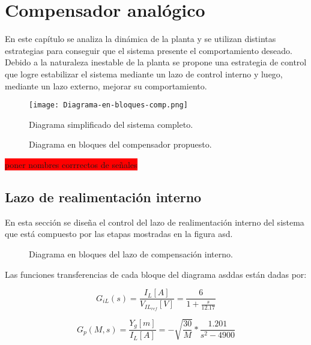 \chapter{Compensador analógico}  \label{cap:Compensador Analogico}

En este capítulo se analiza la dinámica de la planta y se utilizan distintas estrategias para conseguir que el sistema presente el comportamiento deseado. Debido a la naturaleza inestable de la planta se propone una estrategia de control que logre estabilizar el sistema mediante un lazo de control interno y luego, mediante un lazo externo, mejorar su comportamiento. 


\begin{figure}[H]
	\centering
	\texttt{[image: Diagrama-en-bloques-comp.png]}
	\caption{Diagrama simplificado del sistema completo.}
	\label{fig:diag-en-bloques-comp_viejo}
\end{figure}

\begin{figure}[H]
	\centering
	\scalebox{0.8}{}
	\caption{Diagrama en bloques del compensador propuesto.}	\label{fig:diag-en-bloques-comp}
\end{figure}

\colorbox{red}{poner nombres corrrectos de señales}

\section{Lazo de realimentación interno}

En esta sección se diseña el control del lazo de realimentación interno del sistema que está compuesto por las etapas mostradas en la figura asd. 


\begin{figure}[H]
	\centering
	
	\caption{Diagrama en bloques del lazo de compensación interno.}	\label{fig:diag-interno}
\end{figure}

Las funciones transferencias de cada bloque del diagrama asddas están dadas por:

\begin{equation*}
	G_{iL}(s) =\frac{I_L[A]}{V_{IL_{ref}}[V]}=\frac{6}{1+\frac{s}{12.17}}
\end{equation*}

\begin{equation*} 
	G_{p}(M,s)=\frac{Y_g[m]}{I_L[A]}=-\sqrt{\frac{30}{M}}*\frac{1.201}{s^{2}-4900}
\end{equation*}

